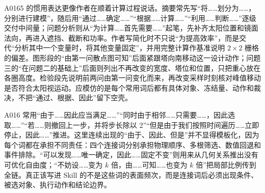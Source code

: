 A0165 的惯用表达更像作者在顺着计算过程说话。摘要常先写“将……划分为……，分别进行建模”，随后用“通过……确定……”“根据……计算……”“利用……判断……”逐级交付中间量；问题分析则从“为计算……首先需要……”起笔，先补齐太阳位置和镜面法向，再进入遮挡、截断和功率。作者写简化时不只说“为提高效率”，而是交代“分析其中一个变量时，将其他变量固定”，并用完整计算作基准说明 $2\times2$ 栅格的偏差。图形段的“由第一问散点图可知”后面紧跟塔向南移动这一设计动作；问题三的“在问题二的基础上”后面则列出不再改变的宽度、塔位和位置，只把重心放在各圈高度。检验段先说明前两问由第一问变化而来，再改变采样时刻核对峰值移动是否符合太阳视运动。应模仿的是每个常用词后都有具体对象、冻结量、动作和裁决，不把“通过、根据、因此”留下空壳。

A016 常用“由于……因此应当满足……”“同时由于相邻……只需要……，因此选取……”“若……则撤回上一步，并将步长除以 2”“但是由于我们按照时间遍历……立即停止，因此……”推进。这里连续出现的“由于、因此、但是”并不显得模板化，因为每个词都在承担不同责任：四个连接词分别承担物理顺序、多根筛选、数值回退和事件排除。“可以发现……唯一确定，因此……固定不变”则用来从几何关系推出没有可优化自由度；“不妨设……变为 $k$ 倍，由……可知……也变为 $k$ 倍”把局部比例传到全链。真正该写进 Skill 的不是这些词的表面频次，而是连接词后必须出现条件、被选对象、执行动作和结论边界。

